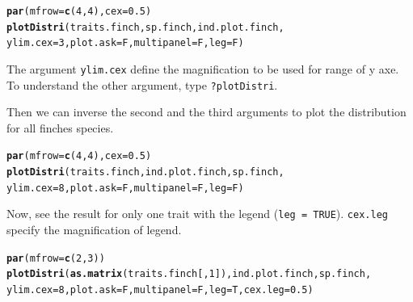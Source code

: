 \documentclass[12pt]{article}\usepackage[]{graphicx}\usepackage[]{color}
\makeatletter
\newcommand{\hlnum}[1]{\textcolor[rgb]{0.686,0.059,0.569}{#1}}%
\newcommand{\hlstd}[1]{\textcolor[rgb]{0.345,0.345,0.345}{#1}}%
\newcommand{\hlkwc}[1]{\textcolor[rgb]{0.333,0.667,0.333}{#1}}%
\newcommand{\hlkwd}[1]{\textcolor[rgb]{0.737,0.353,0.396}{\textbf{#1}}}%
\newenvironment{kframe}{%
 \def\at@end@of@kframe{}%
 \ifinner\ifhmode%
  \def\at@end@of@kframe{\end{minipage}}%
  \begin{minipage}{\columnwidth}%
 \fi\fi%
 \def\FrameCommand##1{\hskip\@totalleftmargin \hskip-\fboxsep
 \colorbox{shadecolor}{##1}\hskip-\fboxsep
     \hskip-\linewidth \hskip-\@totalleftmargin \hskip\columnwidth}%
 \MakeFramed {\advance\hsize-\width
   \@totalleftmargin\z@ \linewidth\hsize
   \@setminipage}}%
 {\par\unskip\endMakeFramed%
 \at@end@of@kframe}
\newenvironment{knitrout}{}{} %
\makeatother
\begin{document}
\begin{knitrout}
\color{fgcolor}\begin{kframe}
\begin{alltt}
\hlkwd{par}\hlstd{(}\hlkwc{mfrow} \hlstd{=} \hlkwd{c}\hlstd{(}\hlnum{4}\hlstd{,}\hlnum{4}\hlstd{),} \hlkwc{cex} \hlstd{=} \hlnum{0.5}\hlstd{)}
\hlkwd{plotDistri}\hlstd{(traits.finch, sp.finch, ind.plot.finch,}
     \hlkwc{ylim.cex} \hlstd{=} \hlnum{3}\hlstd{,} \hlkwc{plot.ask} \hlstd{= F,} \hlkwc{multipanel} \hlstd{= F,} \hlkwc{leg} \hlstd{= F)}
\end{alltt}


{\ttfamily\noindent\bfseries{}}\end{kframe}
\end{knitrout}
The argument \texttt{ylim.cex} define the magnification to be used for range of y axe. To understand the other argument, type \texttt{?plotDistri}.

\newpage

Then we can inverse the second and the third arguments to plot the distribution for all finches species. 

\begin{knitrout}
\color{fgcolor}\begin{kframe}
\begin{alltt}
\hlkwd{par}\hlstd{(}\hlkwc{mfrow} \hlstd{=} \hlkwd{c}\hlstd{(}\hlnum{4}\hlstd{,}\hlnum{4}\hlstd{),} \hlkwc{cex} \hlstd{=} \hlnum{0.5}\hlstd{)}
\hlkwd{plotDistri}\hlstd{(traits.finch, ind.plot.finch, sp.finch,}
      \hlkwc{ylim.cex} \hlstd{=} \hlnum{8}\hlstd{,} \hlkwc{plot.ask} \hlstd{= F,} \hlkwc{multipanel} \hlstd{= F,} \hlkwc{leg} \hlstd{= F)}
\end{alltt}


{\ttfamily\noindent\bfseries{}}\end{kframe}
\end{knitrout}

Now, see the result for only one trait with the legend (\texttt{leg = TRUE}). \texttt{cex.leg} specify the magnification of legend. 

\begin{knitrout}
\color{fgcolor}\begin{kframe}
\begin{alltt}
\hlkwd{par}\hlstd{(}\hlkwc{mfrow} \hlstd{=} \hlkwd{c}\hlstd{(}\hlnum{2}\hlstd{,}\hlnum{3}\hlstd{))}
\hlkwd{plotDistri}\hlstd{(}\hlkwd{as.matrix}\hlstd{(traits.finch[,}\hlnum{1}\hlstd{]), ind.plot.finch, sp.finch,}
     \hlkwc{ylim.cex} \hlstd{=} \hlnum{8}\hlstd{,} \hlkwc{plot.ask} \hlstd{= F,} \hlkwc{multipanel} \hlstd{= F,} \hlkwc{leg} \hlstd{= T,} \hlkwc{cex.leg} \hlstd{=} \hlnum{0.5}\hlstd{)}
\end{alltt}


{\ttfamily\noindent\bfseries{}}\end{kframe}
\end{knitrout}
\end{document}
